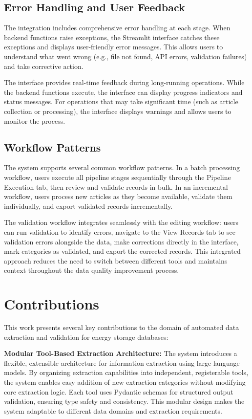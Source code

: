\documentclass[11pt]{article}
\begin{document}
\subsection{Error Handling and User Feedback}

The integration includes comprehensive error handling at each stage. When backend functions raise exceptions, the Streamlit interface catches these exceptions and displays user-friendly error messages. This allows users to understand what went wrong (e.g., file not found, API errors, validation failures) and take corrective action.

The interface provides real-time feedback during long-running operations. While the backend functions execute, the interface can display progress indicators and status messages. For operations that may take significant time (such as article collection or processing), the interface displays warnings and allows users to monitor the process.

\subsection{Workflow Patterns}

The system supports several common workflow patterns. In a batch processing workflow, users execute all pipeline stages sequentially through the Pipeline Execution tab, then review and validate records in bulk. In an incremental workflow, users process new articles as they become available, validate them individually, and export validated records incrementally.

The validation workflow integrates seamlessly with the editing workflow: users can run validation to identify errors, navigate to the View Records tab to see validation errors alongside the data, make corrections directly in the interface, mark categories as validated, and export the corrected records. This integrated approach reduces the need to switch between different tools and maintains context throughout the data quality improvement process.

\section{Contributions}
\label{sec:contributions}

This work presents several key contributions to the domain of automated data extraction and validation for energy storage databases:

\textbf{Modular Tool-Based Extraction Architecture:} The system introduces a flexible, extensible architecture for information extraction using large language models. By organizing extraction capabilities into independent, registerable tools, the system enables easy addition of new extraction categories without modifying core extraction logic. Each tool uses Pydantic schemas for structured output validation, ensuring type safety and consistency. This modular design makes the system adaptable to different data domains and extraction requirements.
\end{document}
